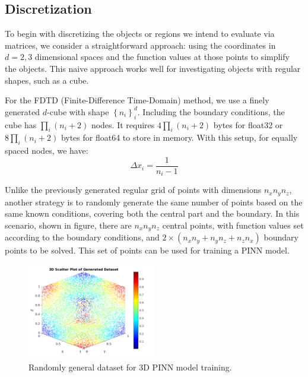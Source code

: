 \subsection{Discretization}
To begin with discretizing the objects or regions we intend to 
evaluate via matrices, we consider a straightforward approach: 
using the coordinates in $d=2,3$ dimensional spaces and the function 
values at those points to simplify the objects. 
This naive approach works well for investigating objects with regular shapes, such as a cube.

For the FDTD (Finite-Difference Time-Domain) method, we use a finely 
generated $d$-cube with shape $\left\{n_i\right\}_i^{d}$. Including 
the boundary conditions, the cube has $\prod_i (n_i+2)$ nodes. 
It requires $4\prod_i (n_i+2)$ bytes for float32 or $8\prod_i (n_i+2)$ bytes 
for float64 to store in memory. 
With this setup, for equally spaced nodes, we have:
\begin{equation}
  \Delta x_i = \frac{1}{n_i-1}
\end{equation}

Unlike the previously generated regular grid of 
points with dimensions $n_xn_yn_z$, 
another strategy is to randomly generate the same number of points based on the same known conditions, 
covering both the central part and the boundary. 
In this scenario, 
shown in figure, 
there are $n_x n_yn_z$ central points, 
with function values set according to the boundary conditions, 
and $2 \times(n_xn_y + n_yn_z + n_zn_x)$ boundary points to be solved. 
This set of points can be used for training a PINN model.

\begin{figure}[htbp]
  \centering
  \includegraphics[width=0.5\textwidth]{figure/FIG_main2_dataset.png}
  \caption{Randomly general dataset for 3D PINN model training.}
  \label{FIG_Topology_Callan}
\end{figure}

